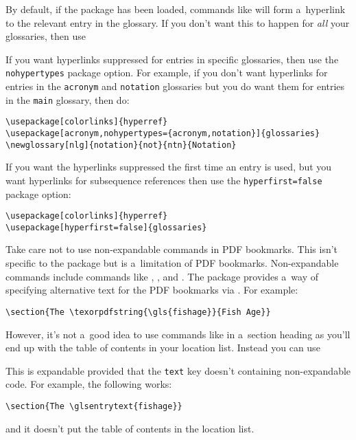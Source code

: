 \documentclass{nlctdoc}
\begin{document}
By default, if the  package has been loaded, commands
like  will form a~hyperlink to the relevant entry in the
glossary. If you don't want this to happen for \emph{all} your
glossaries, then use
\begin{definition}
\end{definition}
If you want hyperlinks suppressed for entries in specific
glossaries, then use the \texttt{nohypertypes} package option. For
example, if you don't want hyperlinks for entries in the \texttt{acronym} and
\texttt{notation} glossaries but you do want them for entries in the
\texttt{main} glossary, then do:
\begin{verbatim}
\usepackage[colorlinks]{hyperref}
\usepackage[acronym,nohypertypes={acronym,notation}]{glossaries}
\newglossary[nlg]{notation}{not}{ntn}{Notation}
\end{verbatim}

If you want the hyperlinks suppressed the first time an entry is
used, but you want hyperlinks for subsequence references then use
the \texttt{hyperfirst=false} package option:
\begin{verbatim}
\usepackage[colorlinks]{hyperref}
\usepackage[hyperfirst=false]{glossaries}
\end{verbatim}

Take care not to use non-expandable commands in PDF bookmarks. This
isn't specific to the  package but is a~limitation
of PDF bookmarks. Non-expandable commands include commands like 
, ,  and . The 
package provides a~way of specifying alternative text for the PDF
bookmarks via . For example:
\begin{verbatim}
\section{The \texorpdfstring{\gls{fishage}}{Fish Age}}
\end{verbatim}
However, it's not a~good idea to use commands like  in
a~section heading as you'll end up with the table of contents in 
your location list. Instead you can use
\begin{definition}
\end{definition}
This is expandable provided that the \texttt{text} key doesn't
containing non-expandable code. For example, the following works:
\begin{verbatim}
\section{The \glsentrytext{fishage}}
\end{verbatim}
and it doesn't put the table of contents in the location list.
\end{document}
